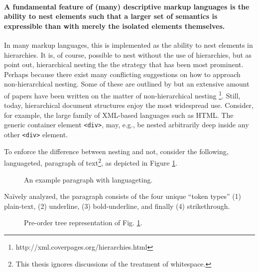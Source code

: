 \documentclass{scrreprt}
\begin{document}
\paragraph{A fundamental feature of (many) descriptive markup languages is the ability to nest elements such that a larger set of semantics is expressible than with merely the isolated elements themselves.} In many markup languages, this is implemented as the ability to nest elements in hierarchies. It is, of course, possible to nest without the use of hierarchies, but as \citet*{durand} point out, hierarchical nesting the the strategy that has been most prominent. Perhaps because there exist many conflicting suggestions on how to approach non-hierarchical nesting. Some of these are outlined by \citet{durand} but an extensive amount of papers have been written on the matter of non-hierarchical nesting \footnote{http://xml.coverpages.org/hierarchies.html}. Still, today, hierarchical document structures enjoy the most widespread use. Consider, for example, the large family of XML-based languages such as HTML. The generic container element \texttt{<div>}, may, e.g., be nested arbitrarily deep inside any other \texttt{<div>} element.



To enforce the difference between nesting and not, consider the following, languageted, paragraph of text\footnote{This thesis ignores discussions of the treatment of whitespace.}, as depicted in Figure \ref{fig:mixed-content-paragraph}.


\begin{figure}[h]
\centering
{}
\caption{An example paragraph with languageting.}
\label{fig:mixed-content-paragraph}
\end{figure}


Naïvely analyzed, the paragraph consists of the four unique ``token types'' (1) plain-text, (2) underline, (3) bold-underline, and finally (4) strikethrough.





\begin{figure}[h]
  \centering

  \caption{Pre-order tree representation of Fig. \ref{fig:mixed-content-paragraph}.}
  \label{fig:mixed-content-flat-tree}
\end{figure}
\end{document}

